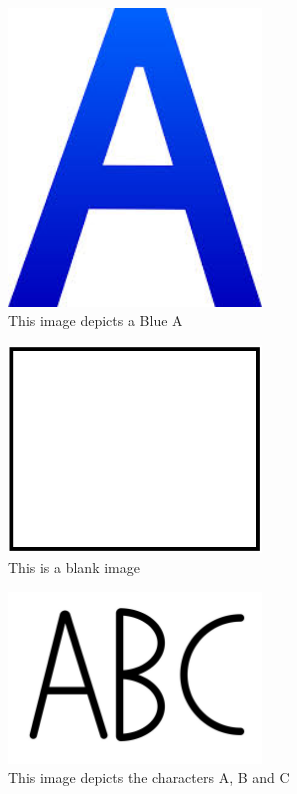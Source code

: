 \documentclass[12pt, titlepage]{article}
\begin{document}
\begin{figure}[h!]
  \begin{center}
    \includegraphics[width=0.6\textwidth]{blueA}
  \caption{This image depicts a Blue A}
  \label{Fig_blueA} 
  \end{center}
  \end{figure}

\begin{figure}[h!]
  \begin{center}
    \includegraphics[width=0.6\textwidth]{Blank_image}
  \caption{This is a blank image}
  \label{Fig_blank} 
  \end{center}
  \end{figure}

\begin{figure}[h!]
  \begin{center}
    \includegraphics[width=0.6\textwidth]{abc_image}
  \caption{This image depicts the characters A, B and C}
  \label{Fig_ABC} 
  \end{center}
  \end{figure}
\end{document}
